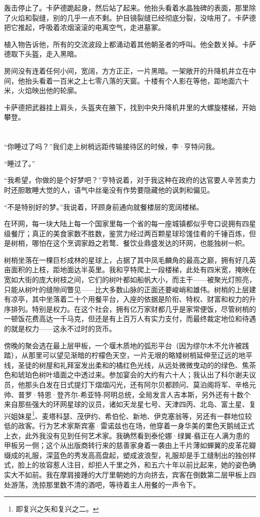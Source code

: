 \documentclass[AutoFakeBold=true]{book}
\begin{document}
轰击停止了。卡萨德跪起身，然后站了起来。他抬头看着水晶独碑的表面，那里除了火焰和裂缝，别的几乎一点不剩。护目镜裂缝已经彻底分裂，没啥用了。卡萨德把它推起，呼吸着浓烟滚滚的电离空气，走进墓冢。

植入物告诉他，所有的交流波段上都涌动着其他朝圣者的呼叫。他全数关掉。卡萨德取下头盔，走入黑暗。

房间没有连着任何小间，宽阔，方方正正，一片黑暗。一架敞开的升降机井立在中间，他抬头看着一百米之上七零八落的天窗。十楼有个人影在等他，距地面六十米，火焰映出他的轮廓。

卡萨德把武器挂上肩头，头盔夹在腋下，找到中央升降机井里的大螺旋楼梯，开始攀登。

\chapter{}

``你睡过了吗？''我们走上树梢远距传输接待区的时候，李·亨特问我。

``睡过了。''

``我希望，你做的是个好梦吧？''亨特说着，对于我这种在政府的达官要人辛苦卖力时还胆敢睡大觉的人，语气中丝毫没有作势要隐藏他的讽刺和偏见。

``不是特别好的梦。''我说着，环顾身前通向就餐楼层的宽阔楼梯。

在环网，每一块大陆上每一个国家里每一个省的每一座城镇都似乎夸口说拥有四星级餐厅；真正的美食家数不胜数，鉴赏力经过两百颗星球珍馐佳肴的千锤百炼，但是树梢，哪怕在这个烹调家趋之若鹜、餐饮业鼎盛发达的环网，也能独树一帜。

树梢坐落在一棵巨杉成林的星球上，占据了其中凤毛麟角的最高之巅，拥有好几英亩面积的上枝，距地面达半英里。我和亨特爬上一段楼梯，此处有四米宽，掩映在宽如大街的庞大树枝之间，它们的树叶都如船帆大小，而主干——被聚光灯照亮，只能从树叶的缝隙间瞥见——比大多数山脉的正面还要峻峭和雄伟。树梢的上层建有凉亭，其中坐落着二十个用餐平台，入座的依据是阶衔、特权、财富和权力的升序排列。特别是权力。在这个社会，拥有亿万家财都几乎是家常便饭，尽管树梢的一顿饭花费高达一千马克，但还是有上百万人有实力支付，而最终裁定地位和待遇的就是权力——这永不过时的货币。

傍晚的聚会选在最上层甲板，一个堰木质地的弧形平台（因为缪尔木不允许被践踏），从那里可以望见渐暗的柠檬色天空，一片无垠的略矮树梢延伸至辽远的地平线，圣徒的树屋和礼拜室发出柔和的橘红色光线，从远处微微曳动的的绿色、焦茶色和琥珀色树叶墙面之中透过来。参加宴会的大约有六十人；我认出了科尔谢夫议员，他那头白发在日式提灯下熠熠闪光，还有阿尔贝都顾问、莫泊阁将军、辛格元帅、普罗·特恩·登齐尔-希亚特-阿明总统，全局发言人吉本斯，另外还有十数个来自那些强大的环网星球的议员，诸如天龙星七号、天津四丙、北岛、富土星、复兴姐妹星\footnote{即复兴之矢和复兴之二。}、麦塔科瑟、茂伊约、希伯伦、新地、伊克塞翁等，另还有一群地位较低的政客。行为艺术家斯宾塞·雷诺兹也在场，他穿着一身华美的栗色天鹅绒正式上衣，此外我没有见到任何艺术家。我确然看到泰伦娜·绿翼-翡正在人满为患的甲板另一侧；这个从出版商转行来的慈善家身着一袭由上千片薄如蝉翼的皮革花瓣缀成的礼服，深蓝色的秀发高高盘起，塑成波浪型，礼服却是手工缝制出的独创样式，脸上的妆容惹人注目，却拒人千里之外，和五六十年以前比起来，她的姿色确实大不如前。我在摩肩接踵的大厅里朝她的方向挤去，宾客在倒数第二层甲板上四处游荡，洗掠那里数不清的酒吧，等待着主人用餐的一声令下。
\end{document}
